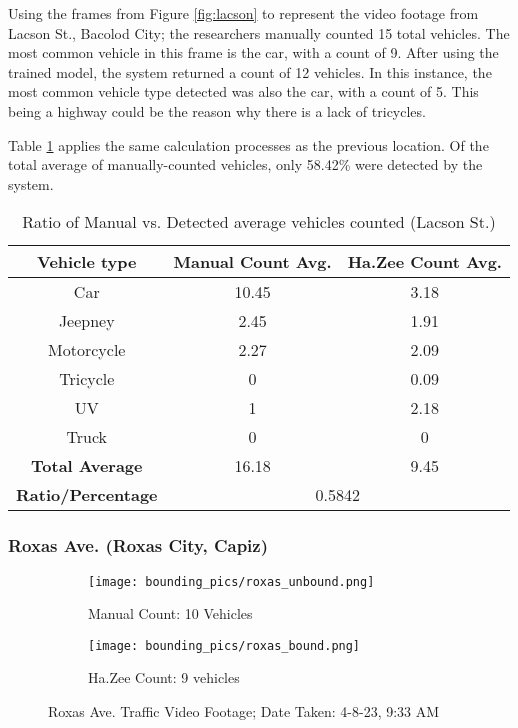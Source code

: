 Using the frames from Figure \ref{fig:lacson} to represent the video footage from Lacson St., Bacolod City; the researchers manually counted 15 total vehicles. The most common vehicle in this frame is the car, with a count of 9. After using the trained model, the system returned a count of 12 vehicles. In this instance, the most common vehicle type detected was also the car, with a count of 5. This being a highway could be the reason why there is a lack of tricycles.

Table \ref{tab:lacson_st} applies the same calculation processes as the previous location. Of the total average of manually-counted vehicles, only 58.42\% were detected by the system. 



\begin{table}[ht]   %
	\centering
	\caption{Ratio of Manual vs. Detected average vehicles counted  (Lacson St.)} \vspace{0.25em}
	\begin{tabular}{c|c|c} \hline
		\centering \textbf {Vehicle type} & \textbf{Manual Count Avg.} & \textbf{Ha.Zee Count Avg.} \\ \hline
		Car & 10.45 & 3.18   \\ 
		Jeepney & 2.45 & 1.91  	\\ 
		Motorcycle& 2.27  & 2.09  \\ 
		Tricycle   & 0  & 0.09  \\ 
		UV & 1 & 2.18  \\ 
		Truck & 0 & 0 \\ \hline
		
		\textbf{Total Average} & 16.18 & 9.45  \\ \hline
		
		\textbf{Ratio/Percentage} & \multicolumn{2}{c}{0.5842}  \\ \hline
		
	\end{tabular}
	\label{tab:lacson_st}
\end{table}

\subsubsection{Roxas Ave. (Roxas City, Capiz)
}


\begin{figure}[!htbp]
	\begin{subfigure}{.5\textwidth}
		\centering
		\texttt{[image: bounding\_pics/roxas\_unbound.png]}
		\caption{Manual Count: 10 Vehicles}
		
	\end{subfigure}%
	\begin{subfigure}{.5\textwidth}
		\centering
		\texttt{[image: bounding\_pics/roxas\_bound.png]}
		\caption{Ha.Zee Count: 9 vehicles}
	\end{subfigure}
	\caption{Roxas Ave. Traffic Video Footage; Date Taken: 4-8-23, 9:33 AM}
	\label{fig:roxas}
\end{figure}
\FloatBarrier

